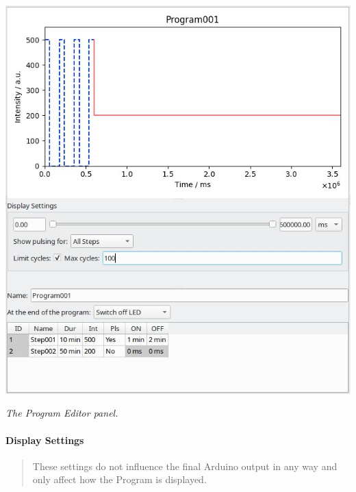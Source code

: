 \includegraphics{images/programeditor.jpg}

\emph{The Program Editor panel.}

\hypertarget{display-settings-1}{%
\paragraph{Display Settings}\label{display-settings-1}}

\begin{quote}
These settings do not influence the final Arduino output in any way and
only affect how the Program is displayed.
\end{quote}

